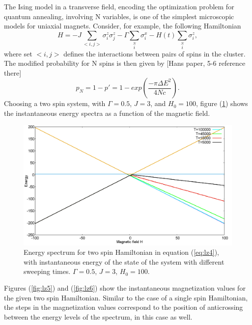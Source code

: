 \documentclass[12]{article}
\begin{document}
The Ising model in a transverse field, encoding the optimization problem for quantum annealing, involving N variables, is one of the simplest microscopic models for uniaxial magnets. Consider, for example, the following Hamiltonian
\begin{equation}
H=-J \sum \limits_{<i,j>} \sigma_i^z \sigma_j^z - \Gamma \sum \limits_i \limits^N \sigma_i^x -H(t) \sum \limits_i \limits^N\sigma_i^z, \label{eq:lz4}
\end{equation} 
where set $<i,j>$ defines the interactions between pairs of spins in the cluster. The modified probability for N spins is then given by [Hans paper, 5-6 reference there]\\
\begin{equation}
p_N=1-p'=1-exp(\frac{-\pi {\Delta E}^2}{4Nc}). \label{eq:lz5}
\end{equation}
Choosing a two spin system, with $\Gamma=0.5$, $J=3$, and $H_0=100$, figure (\ref{fig:lz4}) shows the instantaneous energy spectra as a function of the magnetic field.
\begin{figure}[H]
\centering 
\includegraphics[scale=0.3]{EnergySpectrum_H100.png}
\caption{Energy spectrum for two spin Hamiltonian in equation (\ref{eq:lz4}), with instantaneous energy of the state of the system with different sweeping times. $\Gamma=0.5$, $J=3$, $H_0=100$.}
\label{fig:lz4}
\end{figure}
Figures (\ref{fig:lz5}) and (\ref{fig:lz6}) show the instantaneous magnetization values for the given two spin Hamiltonian. Similar to the case of a single spin Hamiltonian, the steps in the magnetization values correspond to the position of anticrossing between the energy levels of the spectrum, in this case as well. 
\end{document}

